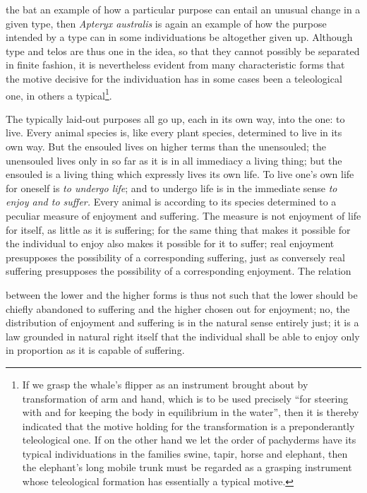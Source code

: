 \documentclass[12pt,a4paper]{book}
\begin{document}
\setcounter{footnote}{0}
the bat an example of how a particular purpose can entail an unusual change in a given
type, then \textit{Apteryx australis} is again an example of how the purpose intended
by a type can in some individuations be altogether given up. Although type and telos
are thus one in the idea, so that they cannot possibly be separated in finite fashion,
it is nevertheless evident from many characteristic forms that the motive decisive for
the individuation has in some cases been a teleological one, in others a
typical\footnote{If we grasp the whale's flipper as an instrument brought about by
transformation of arm and hand, which is to be used precisely ``for steering with and
for keeping the body in equilibrium in the water'', then it is thereby indicated that
the motive holding for the transformation is a preponderantly teleological one. If on
the other hand we let the order of pachyderms have its typical individuations in the
families swine, tapir, horse and elephant, then the elephant's long mobile trunk must
be regarded as a grasping instrument whose teleological formation has essentially a
typical motive.}.

The typically laid-out purposes all go up, each in its own way, into the one: to live.
Every animal species is, like every plant species, determined to live in its own way.
But the ensouled lives on higher terms than the unensouled; the unensouled lives only
in so far as it is in all immediacy a living thing; but the ensouled is a living thing
which expressly lives its own life. To live one's own life for oneself is \emph{to
undergo life}; and to undergo life is in the immediate sense \emph{to enjoy and to
suffer.} Every animal is according to its species determined to a peculiar measure of
enjoyment and suffering. The measure is not enjoyment of life for itself, as little as
it is suffering; for the same thing that makes it possible for the individual to enjoy
also makes it possible for it to suffer; real enjoyment presupposes the possibility of
a corresponding suffering, just as conversely real suffering presupposes the
possibility of a corresponding enjoyment. The relation

between the lower and the higher forms is thus not such that the lower should be
chiefly abandoned to suffering and the higher chosen out for enjoyment; no, the
distribution of enjoyment and suffering is in the natural sense entirely just; it is a
law grounded in natural right itself that the individual shall be able to enjoy only in
proportion as it is capable of suffering.
\end{document}
